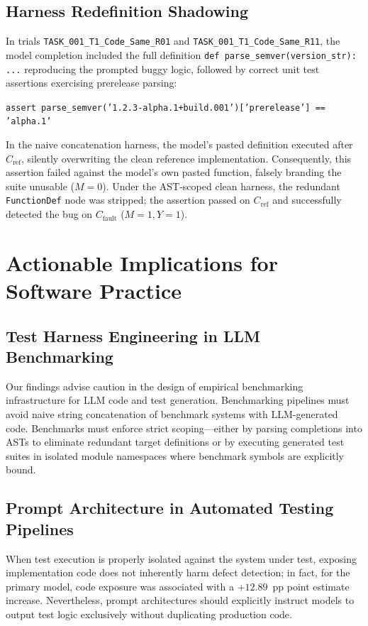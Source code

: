 \documentclass[11pt,a4paper]{article}
\begin{document}
\subsection{Harness Redefinition Shadowing}
In trials \texttt{TASK\_001\_T1\_Code\_Same\_R01} and \texttt{TASK\_001\_T1\_Code\_Same\_R11}, the model completion included the full definition \texttt{def parse\_semver(version\_str): ...} reproducing the prompted buggy logic, followed by correct unit test assertions exercising prerelease parsing:
\begin{center}\vspace{-0.5em}
\small\texttt{assert parse\_semver('1.2.3-alpha.1+build.001')['prerelease'] == 'alpha.1'}
\vspace{-0.5em}\end{center}
In the naive concatenation harness, the model's pasted definition executed after $C_{\text{ref}}$, silently overwriting the clean reference implementation. Consequently, this assertion failed against the model's own pasted function, falsely branding the suite unusable ($M=0$). Under the AST-scoped clean harness, the redundant \texttt{FunctionDef} node was stripped; the assertion passed on $C_{\text{ref}}$ and successfully detected the bug on $C_{\text{fault}}$ ($M=1, Y=1$).


\section{Actionable Implications for Software Practice}
\label{sec:implications}

\subsection{Test Harness Engineering in LLM Benchmarking}
Our findings advise caution in the design of empirical benchmarking infrastructure for LLM code and test generation. Benchmarking pipelines must avoid naive string concatenation of benchmark systems with LLM-generated code. Benchmarks must enforce strict scoping—either by parsing completions into ASTs to eliminate redundant target definitions or by executing generated test suites in isolated module namespaces where benchmark symbols are explicitly bound.

\subsection{Prompt Architecture in Automated Testing Pipelines}
When test execution is properly isolated against the system under test, exposing implementation code does not inherently harm defect detection; in fact, for the primary model, code exposure was associated with a $+12.89$~pp point estimate increase. Nevertheless, prompt architectures should explicitly instruct models to output test logic exclusively without duplicating production code.
\end{document}
